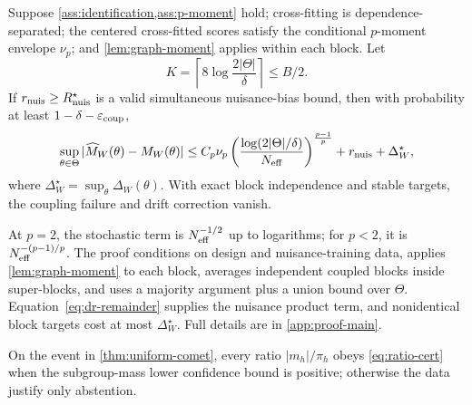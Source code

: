 \begin{theorem}
\label{thm:uniform-comet}
Suppose \cref{ass:identification,ass:p-moment} hold; cross-fitting is dependence-separated; the centered cross-fitted scores satisfy the conditional $p$-moment envelope $\nu_p$; and \cref{lem:graph-moment} applies within each block. Let
\begin{equation*}
K=\left\lceil8\log\frac{2|\Theta|}{\delta}\right\rceil\le B/2.
\end{equation*}
If $r_{\mathrm{nuis}}\ge R_{\mathrm{nuis}}^{\star}$ is a valid simultaneous nuisance-bias bound, then with probability at least $1-\delta-\varepsilon_{\mathrm{coup}}$,
\begin{equation}
\sup_{\theta\in\Theta}|\widehat M_W(\theta)-M_W(\theta)|
\le C_p\nu_p\left(
\frac{\log(2|\Theta|/\delta)}{N_{\mathrm{eff}}}
\right)^{\frac{p-1}{p}}
+r_{\mathrm{nuis}}+\Delta_W^{\star},
\label{eq:main-bound}
\end{equation}
where $\Delta_W^{\star}=\sup_{\theta}\Delta_W(\theta)$. With exact block independence and stable targets, the coupling failure and drift correction vanish.
\end{theorem}

At $p=2$, the stochastic term is $N_{\mathrm{eff}}^{-1/2}$ up to logarithms; for $p<2$, it is $N_{\mathrm{eff}}^{-(p-1)/p}$. The proof conditions on design and nuisance-training data, applies \cref{lem:graph-moment} to each block, averages independent coupled blocks inside super-blocks, and uses a majority argument plus a union bound over $\Theta$. Equation~\eqref{eq:dr-remainder} supplies the nuisance product term, and nonidentical block targets cost at most $\Delta_W^{\star}$. Full details are in \cref{app:proof-main}.

\begin{corollary}
\label{cor:ratio}
On the event in \cref{thm:uniform-comet}, every ratio $|m_h|/\pi_h$ obeys \cref{eq:ratio-cert} when the subgroup-mass lower confidence bound is positive; otherwise the data justify only abstention.
\end{corollary}

